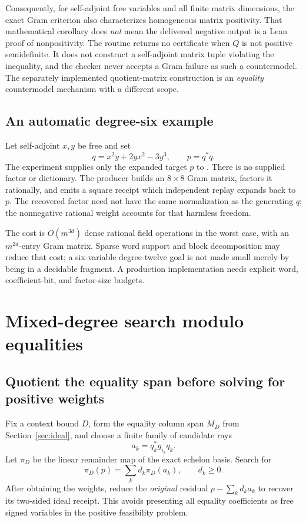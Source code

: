 Consequently, for self-adjoint free variables and all finite matrix dimensions,
the exact Gram criterion also characterizes homogeneous matrix positivity.
That mathematical corollary does \emph{not} mean the delivered negative output is
a Lean proof of nonpositivity. The routine returns no certificate when $Q$ is
not positive semidefinite. It does not construct a self-adjoint matrix tuple
violating the inequality, and the checker never accepts a Gram failure as such
a countermodel. The separately implemented quotient-matrix construction is an
\emph{equality} countermodel mechanism with a different scope.

\subsection{An automatic degree-six example}

Let self-adjoint $x,y$ be free and set
\[
 q=x^2y+2yx^2-3y^3,\qquad p=q^*q.
\]
The experiment supplies only the expanded target $p$ to
. There is no supplied factor or dictionary. The
producer builds an $8\times8$ Gram matrix, factors it rationally, and emits a
square receipt which independent replay expands back to $p$. The recovered
factor need not have the same normalization as the generating $q$; the
nonnegative rational weight accounts for that harmless freedom.

The cost is $O(m^{3d})$ dense rational field operations in the worst case, with
an $m^{2d}$-entry Gram matrix. Sparse word support and block decomposition may
reduce that cost; a six-variable degree-twelve goal is not made small merely by
being in a decidable fragment. A production implementation needs explicit word,
coefficient-bit, and factor-size budgets.

\section{Mixed-degree search modulo equalities}
\label{sec:finite-rays}

\subsection{Quotient the equality span before solving for positive weights}

Fix a context bound $D$, form the equality column span $M_D$ from
Section~\ref{sec:ideal}, and choose a finite family of candidate rays
\[
 a_k=q_k^*g_{i_k}q_k.
\]
Let $\pi_D$ be the linear remainder map of the exact echelon basis. Search for
\begin{equation}\label{eq:ray}
 \pi_D(p)=\sum_k d_k\pi_D(a_k),\qquad d_k\ge0.
\end{equation}
After obtaining the weights, reduce the \emph{original} residual
$p-\sum_kd_ka_k$ to recover its two-sided ideal receipt. This avoids presenting
all equality coefficients as free signed variables in the positive feasibility
problem.


